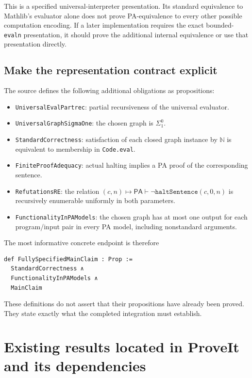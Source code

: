 \documentclass[11pt]{article}
\newcommand{\N}{\mathbb N}
\newcommand{\PA}{\mathsf{PA}}
\theoremstyle{definition}
\theoremstyle{remark}
\begin{document}
This is a specified universal-interpreter presentation. Its standard
equivalence to Mathlib's evaluator alone does not prove PA-equivalence to
every other possible computation encoding. If a later implementation
requires the exact bounded-\texttt{evaln} presentation, it should prove
the additional internal equivalence or use that presentation directly.

\subsection{Make the representation contract explicit}

The source defines the following additional obligations as propositions:
\begin{itemize}
 \item \texttt{UniversalEvalPartrec}: partial recursiveness of the
       universal evaluator.
 \item \texttt{UniversalGraphSigmaOne}: the chosen graph is
       $\Sigma^0_1$.
 \item \texttt{StandardCorrectness}: satisfaction of each closed graph
       instance by $\N$ is equivalent to membership in
       \texttt{Code.eval}.
 \item \texttt{FiniteProofAdequacy}: actual halting implies a PA proof
       of the corresponding sentence.
 \item \texttt{RefutationsRE}: the relation
       $(c,n)\mapsto\PA\vdash\neg\texttt{haltSentence}(c,0,n)$
       is recursively enumerable uniformly in both parameters.
 \item \texttt{FunctionalityInPAModels}: the chosen graph has at most
       one output for each program/input pair in every PA model,
       including nonstandard arguments.
\end{itemize}
The most informative concrete endpoint is therefore
\begin{lstlisting}
def FullySpecifiedMainClaim : Prop :=
  StandardCorrectness ∧
  FunctionalityInPAModels ∧
  MainClaim
\end{lstlisting}
These definitions do not assert that their propositions have already been
proved. They state exactly what the completed integration must establish.

\section{Existing results located in ProveIt and its dependencies}
\end{document}
